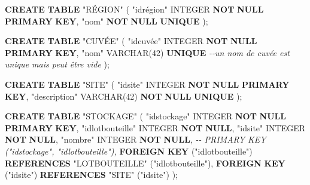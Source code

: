 \documentclass[11pt]{article}
\newenvironment{Shaded}{}{}
\newcommand{\KeywordTok}[1]{\textcolor[rgb]{0.00,0.44,0.13}{\textbf{{#1}}}}
\newcommand{\DataTypeTok}[1]{\textcolor[rgb]{0.56,0.13,0.00}{{#1}}}
\newcommand{\DecValTok}[1]{\textcolor[rgb]{0.25,0.63,0.44}{{#1}}}
\newcommand{\CommentTok}[1]{\textcolor[rgb]{0.38,0.63,0.69}{\textit{{#1}}}}
\newcommand{\OtherTok}[1]{\textcolor[rgb]{0.00,0.44,0.13}{{#1}}}
\newcommand{\NormalTok}[1]{{#1}}
\begin{document}
\begin{Shaded}
\begin{Highlighting}[]
\KeywordTok{CREATE} \KeywordTok{TABLE} \OtherTok{"RÉGION"}\NormalTok{ (}
  \OtherTok{"idrégion"}  \DataTypeTok{INTEGER} \KeywordTok{NOT} \KeywordTok{NULL} \KeywordTok{PRIMARY} \KeywordTok{KEY}\NormalTok{,}
  \OtherTok{"nom"} \KeywordTok{NOT} \KeywordTok{NULL}  \KeywordTok{UNIQUE}
\NormalTok{);}

\KeywordTok{CREATE} \KeywordTok{TABLE} \OtherTok{"CUVÉE"}\NormalTok{ (}
  \OtherTok{"idcuvée"}  \DataTypeTok{INTEGER} \KeywordTok{NOT} \KeywordTok{NULL} \KeywordTok{PRIMARY} \KeywordTok{KEY}\NormalTok{,}
  \OtherTok{"nom"} \DataTypeTok{VARCHAR}\NormalTok{(}\DecValTok{42}\NormalTok{)   }\KeywordTok{UNIQUE}                \CommentTok{{-}{-}un nom de cuvée est unique mais peut être vide}
\NormalTok{);}

\KeywordTok{CREATE} \KeywordTok{TABLE} \OtherTok{"SITE"}\NormalTok{ (}
  \OtherTok{"idsite"} \DataTypeTok{INTEGER} \KeywordTok{NOT} \KeywordTok{NULL} \KeywordTok{PRIMARY} \KeywordTok{KEY}\NormalTok{,}
  \OtherTok{"description"} \DataTypeTok{VARCHAR}\NormalTok{(}\DecValTok{42}\NormalTok{) }\KeywordTok{NOT} \KeywordTok{NULL} \KeywordTok{UNIQUE}  
\NormalTok{);}

\KeywordTok{CREATE} \KeywordTok{TABLE} \OtherTok{"STOCKAGE"}\NormalTok{ (}
  \OtherTok{"idstockage"} \DataTypeTok{INTEGER} \KeywordTok{NOT} \KeywordTok{NULL} \KeywordTok{PRIMARY} \KeywordTok{KEY}\NormalTok{,}
  \OtherTok{"idlotbouteille"} \DataTypeTok{INTEGER} \KeywordTok{NOT} \KeywordTok{NULL}\NormalTok{,}
  \OtherTok{"idsite"} \DataTypeTok{INTEGER} \KeywordTok{NOT} \KeywordTok{NULL}\NormalTok{,}
  \OtherTok{"nombre"} \DataTypeTok{INTEGER} \KeywordTok{NOT} \KeywordTok{NULL}\NormalTok{,}
 \CommentTok{{-}{-} PRIMARY KEY ("idstockage", "idlotbouteille"),}
  \KeywordTok{FOREIGN} \KeywordTok{KEY}\NormalTok{ (}\OtherTok{"idlotbouteille"}\NormalTok{) }\KeywordTok{REFERENCES} \OtherTok{"LOTBOUTEILLE"}\NormalTok{ (}\OtherTok{"idlotbouteille"}\NormalTok{),}
  \KeywordTok{FOREIGN} \KeywordTok{KEY}\NormalTok{ (}\OtherTok{"idsite"}\NormalTok{) }\KeywordTok{REFERENCES} \OtherTok{"SITE"}\NormalTok{ (}\OtherTok{"idsite"}\NormalTok{)}
\NormalTok{);}




\end{Highlighting}
\end{Shaded}
\end{document}
